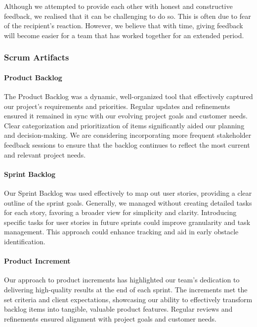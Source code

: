 Although we attempted to provide each other with honest and constructive feedback, we realised that it can be challenging to do so.
This is often due to fear of the recipient's reaction.
However, we believe that with time, giving feedback will become easier for a team that has worked together for an extended period.

\subsubsection{Scrum Artifacts}

\paragraph{Product Backlog}
The Product Backlog was a dynamic, well-organized tool that effectively captured our project's requirements and priorities.
Regular updates and refinements ensured it remained in sync with our evolving project goals and customer needs.
Clear categorization and prioritization of items significantly aided our planning and decision-making.
We are considering incorporating more frequent stakeholder feedback sessions to ensure that the backlog continues to reflect the most current and relevant project needs.

\paragraph{Sprint Backlog}
Our Sprint Backlog was used effectively to map out user stories, providing a clear outline of the sprint goals.
Generally, we managed without creating detailed tasks for each story, favoring a broader view for simplicity and clarity.
Introducing specific tasks for user stories in future sprints could improve granularity and task management.
This approach could enhance tracking and aid in early obstacle identification.

\paragraph{Product Increment}
Our approach to product increments has highlighted our team's dedication to delivering high-quality results at the end of each sprint.
The increments met the set criteria and client expectations, showcasing our ability to effectively transform backlog items into tangible, valuable product features.
Regular reviews and refinements ensured alignment with project goals and customer needs.


